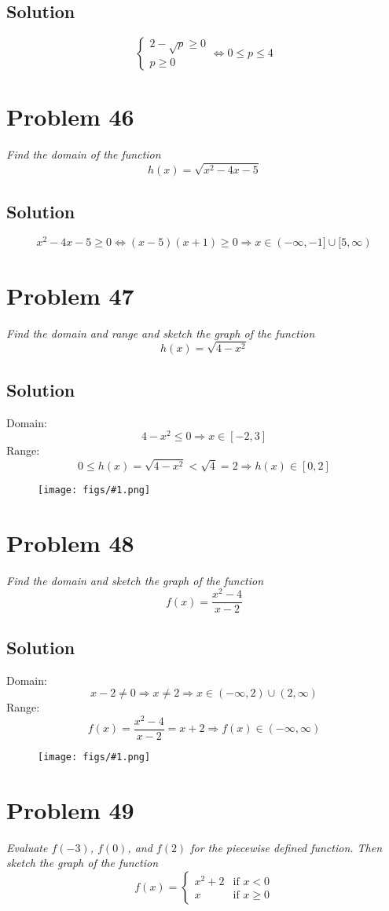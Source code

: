 \documentclass[11pt]{article}
\newcommand{\soln}{\subsection*}
\newcommand{\qn}{\textit}
\newcommand{\imgsoln}[1]{
	\begin{figure}[h]
		\centering
		\texttt{[image: figs/\#1.png]}
	\end{figure}
}
\begin{document}
\soln{Solution}
\begin{equation*}
	\begin{cases}
		2 - \sqrt{p} \ge 0 \\
		p \ge 0
	\end{cases}
	\Leftrightarrow
	0 \le p \le 4
\end{equation*}

\section*{Problem 46}

\qn{Find the domain of the function $$h(x)=\sqrt{x^2-4x-5}$$}

\soln{Solution}
\begin{equation*}
	x^2-4x-5 \ge 0 \Leftrightarrow (x-5)(x+1) \ge 0 \Rightarrow x \in (-\infty,-1] \cup [5, \infty)
\end{equation*}

\section*{Problem 47}

\qn{Find the domain and range and sketch the graph of the function $$h(x)=\sqrt{4-x^2}$$}

\soln{Solution}
Domain: $$4-x^2 \le 0 \Rightarrow x \in [-2, 3]$$
Range: $$0 \le h(x)=\sqrt{4-x^2}<\sqrt{4}=2 \Rightarrow h(x) \in [0, 2]$$
\imgsoln{1.1.47-ans}

\section*{Problem 48}

\qn{Find the domain and sketch the graph of the function $$f(x)=\frac{x^2-4}{x-2}$$}

\soln{Solution}
Domain: $$x-2 \ne 0 \Rightarrow x \ne 2 \Rightarrow x \in (-\infty, 2) \cup (2, \infty)$$
Range: $$f(x)=\frac{x^2-4}{x-2}=x+2 \Rightarrow f(x) \in (-\infty, \infty)$$
\imgsoln{1.1.48-ans}

\section*{Problem 49}

\qn{Evaluate $f(-3)$, $f(0)$, and $f(2)$ for the piecewise defined function. Then sketch the graph of the function}
\begin{equation}
	f(x)=
	\begin{cases}
		x^2+2 & \text{if } x < 0\\
		x & \text{if } x \ge 0
	\end{cases}
\end{equation}
\end{document}
